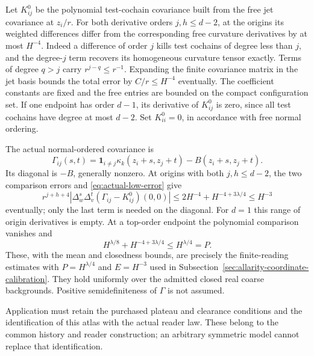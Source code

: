 Let $K^0_{ij}$ be the polynomial test-cochain covariance built
from the free jet covariance at $z_i/r$. For both derivative orders
$j,h\le d-2$, at the origins its
weighted differences differ from the corresponding free curvature
derivatives by at most $H^{-4}$. Indeed a difference of order $j$
kills test cochains of degree less than $j$, and the degree-$j$
term recovers its homogeneous curvature tensor exactly. Terms of
degree $q>j$ carry $r^{j-q}\le r^{-1}$. Expanding the finite
covariance matrix in the jet basis bounds the total error by
$C/r\le H^{-4}$ eventually. The coefficient constants are fixed
and the free entries are bounded on the compact configuration set.
If one endpoint has order $d-1$, its derivative of $K^0_{ij}$
is zero, since all test cochains have degree at most $d-2$.
Set $K^0_{ii}=0$, in accordance with free normal ordering.

The actual normal-ordered covariance is
\begin{equation}\label{eq:actual-normalordered-covariance}
 \Gamma_{ij}(s,t)=\mathbf1_{i\ne j}
   \kappa_k(z_i+s,z_j+t)-B(z_i+s,z_j+t).
\end{equation}
Its diagonal is $-B$, generally nonzero. At origins with both
$j,h\le d-2$, the two
comparison errors and \eqref{eq:actual-low-error} give
\[
 r^{j+h+4}|\Delta_w^s\Delta_v^t(\Gamma_{ij}-K^0_{ij})(0,0)|
 \le2H^{-4}+H^{-4+3\lambda/4}\le H^{-3}
\]
eventually; only the last term is needed on the diagonal. For $d=1$
this range of origin derivatives is empty.
At a top-order endpoint the polynomial comparison vanishes and
\[
 H^{\lambda/8}+H^{-4+3\lambda/4}\le H^{\lambda/4}=P.
\]
These, with the mean and closedness bounds, are precisely the
finite-reading estimates with $P=H^{\lambda/4}$ and $E=H^{-3}$
used in Subsection~\ref{sec:allarity-coordinate-calibration}.
They hold uniformly over the admitted closed real coarse backgrounds.
Positive semidefiniteness of $\Gamma$ is not assumed.

Application must retain the purchased plateau and clearance conditions
and the identification of this atlas with the actual reader law.
These belong to the common history and reader construction; an
arbitrary symmetric model cannot replace that identification.
